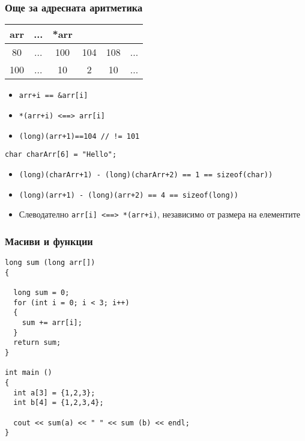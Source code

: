 \documentclass{beamer}
\begin{document}
\begin{frame}[fragile]
\frametitle{Още за адресната аритметика}


\begin{tabular} {c | c | c | c | c | c }

arr &... &*arr \\\hline
80  &... & 100 & 104 & 108 &... \\\hline
100 &... & 10   & 2   & 10   &... \\\hline
  
\end{tabular}

\vspace{15px}

\begin{itemize}
\item \texttt{arr+i == \&arr[i]}
\pause
\item \texttt{*(arr+i) <==> arr[i]}
\pause
\item \texttt{(long)(arr+1)==104 // != 101}
\end{itemize}

\pause

\begin{flushleft}
\begin{lstlisting}
char charArr[6] = "Hello";
\end{lstlisting}
\end{flushleft}

\begin{itemize}
  \item \texttt{(long)(charArr+1) - (long)(charArr+2) == 1 == sizeof(char))}
  \item \texttt{(long)(arr+1) - (long)(arr+2) == 4 == sizeof(long))}
  \item Слеводателно \texttt{arr[i] <==> *(arr+i)}, независимо от размера на елементите
\end{itemize}


\end{frame}




\begin{frame}[fragile]
\frametitle{Масиви и функции}

\begin{flushleft}
\begin{lstlisting}
long sum (long arr[])
{
  
  long sum = 0;
  for (int i = 0; i < 3; i++)
  {
    sum += arr[i];
  }
  return sum;
}

int main ()
{
  int a[3] = {1,2,3};
  int b[4] = {1,2,3,4};

  cout << sum(a) << " " << sum (b) << endl;
}

\end{lstlisting}
\end{flushleft}

\end{frame}
\end{document}
